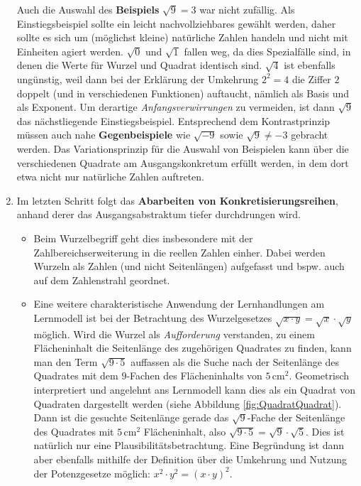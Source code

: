 \documentclass[
  ngerman,
]{scrbook}
\theoremstyle{definition}
\theoremstyle{definition}
\theoremstyle{definition}
\theoremstyle{definition}
\theoremstyle{remark}
\begin{document}
\begin{enumerate}
  Auch die Auswahl des \textbf{Beispiels} \(\sqrt{9}=3\) war nicht zufällig. Als Einstiegsbeispiel sollte ein leicht nachvollziehbares gewählt werden, daher sollte es sich um (möglichst kleine) natürliche Zahlen handeln und nicht mit Einheiten agiert werden. \(\sqrt{0}\) und \(\sqrt{1}\) fallen weg, da dies Spezialfälle sind, in denen die Werte für Wurzel und Quadrat identisch sind. \(\sqrt{4}\) ist ebenfalls ungünstig, weil dann bei der Erklärung der Umkehrung \(2^2 = 4\) die Ziffer \(2\) doppelt (und in verschiedenen Funktionen) auftaucht, nämlich als Basis und als Exponent. Um derartige \emph{Anfangsverwirrungen} zu vermeiden, ist dann \(\sqrt{9}\) das nächstliegende Einstiegsbeispiel. Entsprechend dem Kontrastprinzip müssen auch nahe \textbf{Gegenbeispiele} wie \(\sqrt{-9}\) sowie \(\sqrt{9}\neq -3\) gebracht werden. Das Variationsprinzip für die Auswahl von Beispielen kann über die verschiedenen Quadrate am Ausgangskonkretum erfüllt werden, in dem dort etwa nicht nur natürliche Zahlen auftreten.
\item
  Im letzten Schritt folgt das \textbf{Abarbeiten von Konkretisierungsreihen}, anhand derer das Ausgangsabstraktum tiefer durchdrungen wird.

  \begin{itemize}
  \item
    Beim Wurzelbegriff geht dies insbesondere mit der Zahlbereichserweiterung in die reellen Zahlen einher. Dabei werden Wurzeln als Zahlen (und nicht Seitenlängen) aufgefasst und bspw. auch auf dem Zahlenstrahl geordnet.
  \item
    Eine weitere charakteristische Anwendung der Lernhandlungen am Lernmodell ist bei der Betrachtung des Wurzelgesetzes \(\sqrt{x\cdot y} = \sqrt{x}\cdot \sqrt{y}\) möglich. Wird die Wurzel als \emph{Aufforderung} verstanden, zu einem Flächeninhalt die Seitenlänge des zugehörigen Quadrates zu finden, kann man den Term \(\sqrt{9\cdot 5}\) auffassen als die Suche nach der Seitenlänge des Quadrates mit dem \(9\)-Fachen des Flächeninhalts von \(5\,\mathrm{cm}^2\). Geometrisch interpretiert und angelehnt ans Lernmodell kann dies als ein Quadrat von Quadraten dargestellt werden (siehe Abbildung \ref{fig:QuadratQuadrat}). Dann ist die gesuchte Seitenlänge gerade das \(\sqrt{9}\)-Fache der Seitenlänge des Quadrates mit \(5\,\mathrm{cm}^2\) Flächeninhalt, also \(\sqrt{9\cdot 5} = \sqrt{9}\cdot \sqrt{5}\). Dies ist natürlich nur eine Plausibilitätsbetrachtung. Eine Begründung ist dann aber ebenfalls mithilfe der Definition über die Umkehrung und Nutzung der Potenzgesetze möglich: \(x^2\cdot y^2 = (x\cdot y)^2\).
  \end{itemize}


\end{enumerate}
\end{document}
